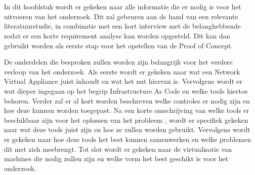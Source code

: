 \chapter{}%
\label{ch:stand-van-zaken}

In dit hoofdstuk wordt er gekeken naar alle informatie die er nodig is voor het uitvoeren van het onderzoek. Dit zal gebeuren aan de hand van een relevante literatuurstudie, in combinatie met een kort interview met de belanghebbende zodat er een korte requirement analyse kan worden opgesteld. Dit kan dan gebruikt worden als eerste stap voor het opstellen van de Proof of Concept. \newline

De onderdelen die besproken zullen worden zijn belangrijk voor het verdere verloop van het onderzoek. Als eerste wordt er gekeken naar wat een Network Virtual Appliance juist inhoudt en wat het nut hiervan is. Vervolgens wordt er wat dieper ingegaan op het begrip Infrastructure As Code en welke tools hiertoe behoren. Verder zal er al kort worden beschreven welke controles er nodig zijn en hoe deze kunnen worden toegepast. Na een korte omschrijving van welke tools er beschikbaar zijn voor het oplossen van het probleem , wordt er specifiek gekeken naar wat deze tools juist zijn en hoe ze zullen worden gebruikt. Vervolgens wordt er gekeken naar hoe deze tools het best kunnen samenwerken en welke problemen dit met zich meebrengt. Tot slot wordt er gekeken naar de virtualisatie van machines die nodig zullen zijn en welke vorm het best geschikt is voor het onderzoek.




